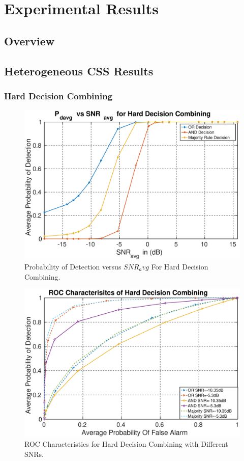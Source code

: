 \chapter{Experimental Results}
\label{chapter6}

\section{Overview} 

\section{Heterogeneous CSS Results}

\subsection{Hard Decision Combining}

\begin{figure}[ht!]
	\centering
	\includegraphics[width=\textwidth,keepaspectratio]{images/Gill/figs/hardecisionpd.eps}
    \caption{Probability of Detection versus $SNR_avg$ For Hard Decision Combining.} 
\label{hardres}      
\end{figure}

\begin{figure}[ht!]
	\centering
	\includegraphics[width=\textwidth,keepaspectratio]{images/Gill/figs/hardecisioroc.eps}
    \caption{ROC Characteristics for Hard Decision Combining with Different SNRs.} 
\label{hardroc}      
\end{figure}

